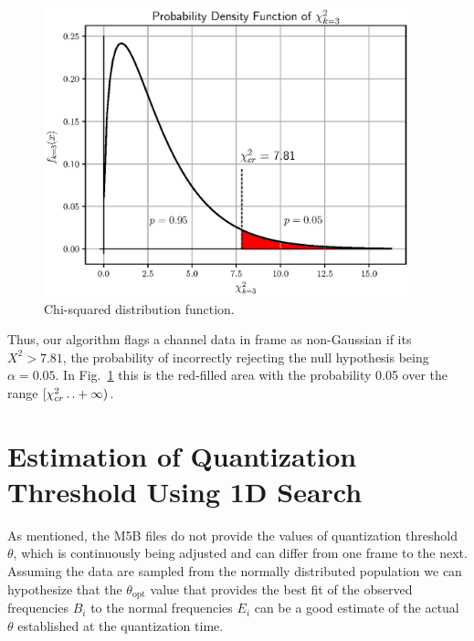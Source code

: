 \documentclass[letterpaper,twoside,12pt]{article}
\newcommand{\twodots}{\mathinner {\ldotp \ldotp}}
\begin{document}
\begin{figure}[ht!]
  \begin{center}
  \includegraphics[width=25pc]{fig_chi2_pdf.eps}
  \caption{\small Chi-squared distribution function.}
  \label{chi2_pdf}
  \end{center}
\end{figure}

Thus, our algorithm flags a channel data in frame as non-Gaussian if its $X^2 > 7.81$, the probability of incorrectly rejecting the null hypothesis being $\alpha = 0.05$. In Fig.~\ref{chi2_pdf} this is the red-filled area with the probability 0.05 over the range $[\chi^2_{cr} \twodots +\infty)$. 



\section{Estimation of Quantization Threshold Using 1D Search}

As mentioned, the M5B files do not provide the values of quantization threshold $\theta$, which is continuously being adjusted and can differ from one frame to the next. Assuming the data are sampled from the normally distributed population we can hypothesize that the $\theta_{\text{opt}}$ value that provides the best fit of the observed frequencies $B_i$ to the normal frequencies $E_i$ can be a good estimate of the actual $\theta$ established at the quantization time.
\end{document}
